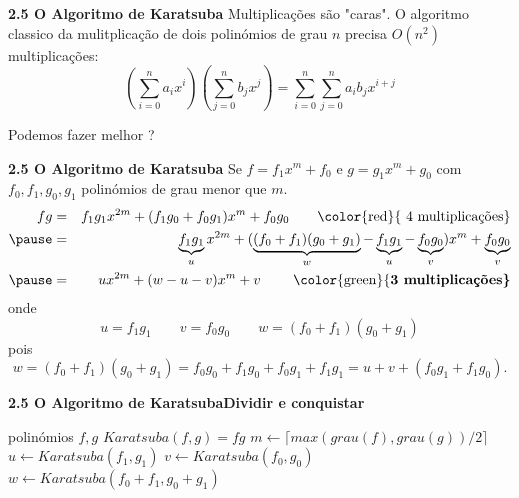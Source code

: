 \documentclass{beamer}
\begin{document}
\begin{frame}{\bf 2.5 O Algoritmo de Karatsuba}
Multiplicações são "caras". O algoritmo classico da mulitplicação de dois polinómios de grau $n$ precisa $O(n^2)$ multiplicações:
$$ \left(\sum_{i=0}^n a_i x^i \right)\left( \sum_{j=0}^n b_j x^j \right) = \sum_{i=0}^n \sum_{j=0}^n a_ib_j x^{i+j}$$

Podemos fazer melhor ?
\end{frame}

\begin{frame}{\bf 2.5 O Algoritmo de Karatsuba}
Se $f=f_1 x^m + f_0$ e $g=g_1 x^m + g_0$ com $f_0,f_1,g_0,g_1$ polinómios de grau menor que $m$.
\begin{eqnarray*} 
fg &=& f_1g_1 x^{2m} + (f_1g_0+f_0g_1) x^m + f_0g_0 \qquad \mbox{\color{red}{ 4 multiplicações}} \\\pause
   &=& \underbrace{f_1g_1}_u x^{2m} + ( \underbrace{(f_0+f_1)(g_0+g_1)}_w-\underbrace{f_1g_1}_u-\underbrace{f_0g_0}_v) x^m + \underbrace{f_0g_0}_v \\\pause
   &=& u x^{2m} + ( w-u-v) x^m + v \qquad \mbox{ \color{green}{\bf 3 multiplicações}} 
\end{eqnarray*}
onde $$ u=f_1g_1 \qquad v=f_0g_0 \qquad w=(f_0+f_1)(g_0+g_1)$$\pause
pois 
$$ w=(f_0+f_1)(g_0+g_1)=f_0g_0+f_1g_0+f_0g_1+f_1g_1 = u+v + (f_0g_1+f_1g_0).$$
\end{frame}

\begin{frame}[fragile]{\bf 2.5 O Algoritmo de Karatsuba}{\bf Dividir e conquistar}
\begin{algorithmic}
\REQUIRE polinómios $f,g$
\ENSURE $Karatsuba(f,g)=fg$
	\STATE $m\leftarrow \lceil max(grau(f),grau(g))/2 \rceil$
     
	\ELSE
		\STATE $u\leftarrow Karatsuba(f_1,g_1)$
		\STATE $v\leftarrow Karatsuba(f_0,g_0)$
		\STATE $w\leftarrow Karatsuba(f_0+f_1,g_0+g_1)$
	\ENDIF
\end{algorithmic}
\end{frame}
\end{document}
